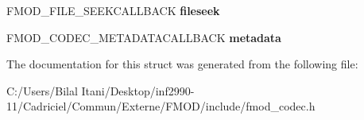 \begin{DoxyCompactItemize}
\item 
F\+M\+O\+D\+\_\+\+F\+I\+L\+E\+\_\+\+S\+E\+E\+K\+C\+A\+L\+L\+B\+A\+CK {\bfseries fileseek}\hypertarget{struct_f_m_o_d___c_o_d_e_c___s_t_a_t_e_a687641e4351497085141f91e70831928}{}\label{struct_f_m_o_d___c_o_d_e_c___s_t_a_t_e_a687641e4351497085141f91e70831928}

\item 
F\+M\+O\+D\+\_\+\+C\+O\+D\+E\+C\+\_\+\+M\+E\+T\+A\+D\+A\+T\+A\+C\+A\+L\+L\+B\+A\+CK {\bfseries metadata}\hypertarget{struct_f_m_o_d___c_o_d_e_c___s_t_a_t_e_ac567cbf774e3f9dbbc8a3c4dd351ddd4}{}\label{struct_f_m_o_d___c_o_d_e_c___s_t_a_t_e_ac567cbf774e3f9dbbc8a3c4dd351ddd4}

\end{DoxyCompactItemize}


The documentation for this struct was generated from the following file\+:\begin{DoxyCompactItemize}
\item 
C\+:/\+Users/\+Bilal Itani/\+Desktop/inf2990-\/11/\+Cadriciel/\+Commun/\+Externe/\+F\+M\+O\+D/include/fmod\+\_\+codec.\+h\end{DoxyCompactItemize}
